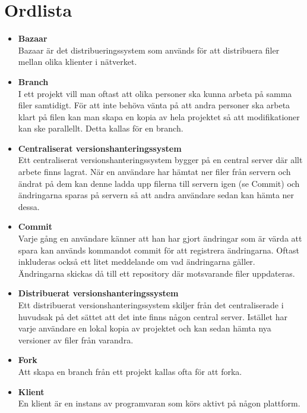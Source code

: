 \section{Ordlista}
\begin{itemize}
        \item \textbf{Bazaar}
        \\Bazaar är det distribueringssystem som används för att distribuera filer mellan olika klienter i nätverket.
	\item \textbf{Branch}
	\\I ett projekt vill man oftast att olika personer ska kunna arbeta på samma filer samtidigt. För att inte behöva vänta på att andra personer ska arbeta klart på filen kan man skapa en kopia av hela projektet så att modifikationer kan ske parallellt. Detta kallas för en branch.
	
	\item \textbf{Centraliserat versionshanteringssystem}
	\\Ett centraliserat versionshanteringssystem bygger på en central server där allt arbete finns lagrat. När en användare har hämtat ner filer från servern och ändrat på dem kan denne ladda upp filerna till servern igen (se Commit) och ändringarna sparas på servern så att andra användare sedan kan hämta ner dessa.
	
	\item \textbf{Commit}
	\\Varje gång en användare känner att han har gjort ändringar som är värda att spara kan används kommandot commit för att registrera ändringarna. Oftast inkluderas också ett litet meddelande om vad ändringarna gäller. Ändringarna skickas då till ett repository där motsvarande filer uppdateras.
	
	\item \textbf{Distribuerat versionshanteringssystem}
	\\Ett distribuerat versionshanteringssystem skiljer från det centraliserade i huvudsak på det sättet att det inte finns någon central server. Istället har varje användare en lokal kopia av projektet och kan sedan hämta nya versioner av filer från varandra.
	
	\item \textbf{Fork}
	\\Att skapa en branch från ett projekt kallas ofta för att forka.
	
	\item \textbf{Klient}
	\\En klient är en instans av programvaran som körs aktivt på någon
plattform.	
	

\end{itemize}
